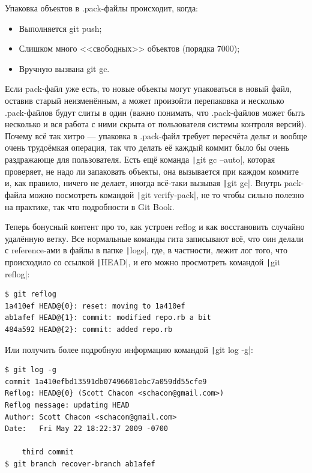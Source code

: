 \documentclass[a5paper]{article}
\begin{document}
Упаковка объектов в .pack-файлы происходит, когда:
\begin{itemize}
	\item Выполняется git push;
	\item Слишком много <<свободных>> объектов (порядка 7000);
	\item Вручную вызвана git gc.
\end{itemize}

Если pack-файл уже есть, то новые объекты могут упаковаться в новый файл, оставив старый неизменённым, а может произойти перепаковка и несколько .pack-файлов будут слиты в один (важно понимать, что .pack-файлов может быть несколько и вся работа с ними скрыта от пользователя системы контроля версий). Почему всё так хитро --- упаковка в .pack-файл требует пересчёта дельт и вообще очень трудоёмкая операция, так что делать её каждый коммит было бы очень раздражающе для пользователя. Есть ещё команда \texttt|git gc --auto|, которая проверяет, не надо ли запаковать объекты, она вызывается при каждом коммите и, как правило, ничего не делает, иногда всё-таки вызывая \texttt|git gc|. Внутрь pack-файла можно посмотреть командой \texttt|git verify-pack|, не то чтобы сильно полезно на практике, так что подробности в Git Book.

Теперь бонусный контент про то, как устроен reflog и как восстановить случайно удалённую ветку. Все нормальные команды гита записывают всё, что оин делали с reference-ами в файлы в папке \texttt|logs|, где, в частности, лежит лог того, что происходило со ссылкой \texttt|HEAD|, и его можно просмотреть командой \texttt|git reflog|:

\begin{verbatim}
$ git reflog
1a410ef HEAD@{0}: reset: moving to 1a410ef
ab1afef HEAD@{1}: commit: modified repo.rb a bit
484a592 HEAD@{2}: commit: added repo.rb
\end{verbatim}

Или получить более подробную информацию командой \texttt|git log -g|:

\begin{verbatim}
$ git log -g
commit 1a410efbd13591db07496601ebc7a059dd55cfe9
Reflog: HEAD@{0} (Scott Chacon <schacon@gmail.com>)
Reflog message: updating HEAD
Author: Scott Chacon <schacon@gmail.com>
Date:   Fri May 22 18:22:37 2009 -0700

    third commit
$ git branch recover-branch ab1afef
\end{verbatim}
\end{document}
